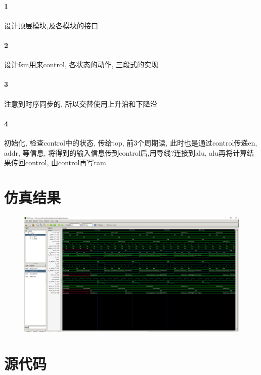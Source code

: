 \documentclass[UTF8]{ctexart}
\begin{document}
\paragraph{1}设计顶层模块,及各模块的接口
\paragraph{2}设计fsm用来control, 各状态的动作, 三段式的实现
\paragraph{3}注意到时序同步的, 所以交替使用上升沿和下降沿
\paragraph{4}
初始化,
检查control中的状态, 传给top, 前3个周期读,
此时也是通过control传递en, addr, 等信息,
将得到的输入信息传到control后,用导线?连接到alu,
alu再将计算结果传回control,
由control再写ram


\section{仿真结果}
\begin{figure}[H]
  \centering
  \includegraphics[width=1\textwidth]{wave.png}
\end{figure}



\section{源代码}
\end{document}
